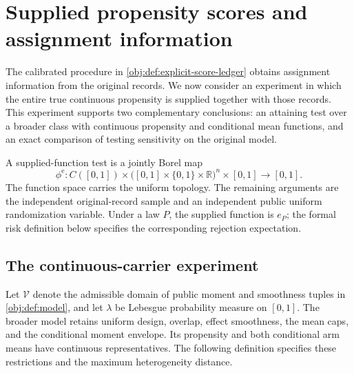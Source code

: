 \section{Supplied propensity scores and assignment information}

The calibrated procedure in \cref{obj:def:explicit-score-ledger} obtains assignment information from the original records. We now consider an experiment in which the entire true continuous propensity is supplied together with those records. This experiment supports two complementary conclusions: an attaining test over a broader class with continuous propensity and conditional mean functions, and an exact comparison of testing sensitivity on the original model.

A supplied-function test  is a jointly Borel map
\[
\phi^{\mathrm e}:
C([0,1])\times
\bigl([0,1]\times\{0,1\}\times\mathbb R\bigr)^n
\times[0,1]\longrightarrow[0,1].
\]
The function space carries the uniform topology. The remaining arguments are the independent original-record sample and an independent public uniform randomization variable. Under a law \(P\), the supplied function is \(e_P\); the formal risk definition below specifies the corresponding rejection expectation.

\subsection{The continuous-carrier experiment}

Let \(\mathcal V\) denote the admissible domain of public moment and smoothness tuples in \cref{obj:def:model}, and let \(\lambda\) be Lebesgue probability measure on \([0,1]\). The broader model retains uniform design, overlap, effect smoothness, the mean caps, and the conditional moment envelope. Its propensity and both conditional arm means have continuous representatives. The following definition specifies these restrictions and the maximum heterogeneity distance.

